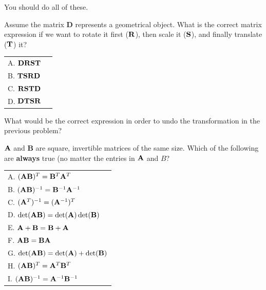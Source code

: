 \begin{prob}
You should do all of these.
\be
\item Assume the matrix $\mathbf{D}$ represents a geometrical object. What is the correct matrix expression if we want to rotate it first ($\R$), then scale it ($\S$), and finally translate ($\T$) it?

\begin{tabular}{ll}
A. $\mathbf{D} \R \S \T$ \\
B. $\T \S \R \mathbf{D}$ \\
C. $\R \S \T \mathbf{D}$ \\
D. $\mathbf{D} \T \S \R$
\end{tabular}

\item What would be the correct expression in order to undo the transformation in the previous problem?

\item $\A$ and $\mathbf{B}$ are square, invertible matrices of the same size. Which of the following are \textbf{always} true (no matter the entries in $\A$ and $B$? 

\begin{tabular}{l}
A. $(\A \mathbf{B})^T = \mathbf{B}^T \A^T$ \\
B. $(\A \mathbf{B})^{-1} = \mathbf{B}^{-1} \A^{-1}$ \\
C. $(\A^T)^{-1} = (\A^{-1})^T$ \\
D. $\det(\A \mathbf{B}) = \det(\A) \det(\mathbf{B})$ \\
E. $\A + \mathbf{B} = \mathbf{B} + \A$ \\
F. $\A \mathbf{B} = \mathbf{B} \A$ \\
G. $\det(\A \mathbf{B}) = \det(\A) + \det(\mathbf{B})$ \\
H. $(\A \mathbf{B})^T = \A^T \mathbf{B}^T$ \\
I. $(\A \mathbf{B})^{-1} = \A^{-1} \mathbf{B}^{-1}$
\end{tabular}
\ee
\end{prob}


